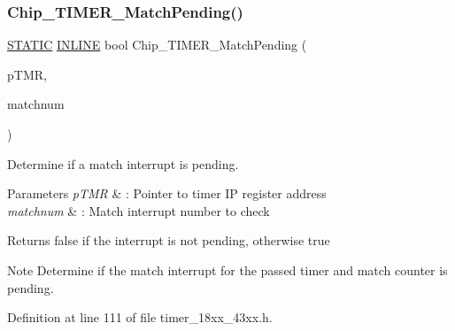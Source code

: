 \subsubsection{\texorpdfstring{Chip\+\_\+\+T\+I\+M\+E\+R\+\_\+\+Match\+Pending()}{Chip\_TIMER\_MatchPending()}}
{\footnotesize\ttfamily \hyperlink{group___l_p_c___types___public___macros_ga10b2d890d871e1489bb02b7e70d9bdfb}{S\+T\+A\+T\+IC} \hyperlink{spifi__18xx__43xx_8h_a2eb6f9e0395b47b8d5e3eeae4fe0c116}{I\+N\+L\+I\+NE} bool Chip\+\_\+\+T\+I\+M\+E\+R\+\_\+\+Match\+Pending (\begin{DoxyParamCaption}\item[{\hyperlink{struct_l_p_c___t_i_m_e_r___t}{L\+P\+C\+\_\+\+T\+I\+M\+E\+R\+\_\+T} $\ast$}]{p\+T\+MR,  }\item[{int8\+\_\+t}]{matchnum }\end{DoxyParamCaption})}



Determine if a match interrupt is pending. 


\begin{DoxyParams}{Parameters}
{\em p\+T\+MR} & \+: Pointer to timer IP register address \\
\hline
{\em matchnum} & \+: Match interrupt number to check \\
\hline
\end{DoxyParams}
\begin{DoxyReturn}{Returns}
false if the interrupt is not pending, otherwise true 
\end{DoxyReturn}
\begin{DoxyNote}{Note}
Determine if the match interrupt for the passed timer and match counter is pending. 
\end{DoxyNote}


Definition at line 111 of file timer\+\_\+18xx\+\_\+43xx.\+h.

\mbox{\label{group___t_i_m_e_r__18_x_x__43_x_x_gaa2483e6483702140e11de3183d5271f9}} 
